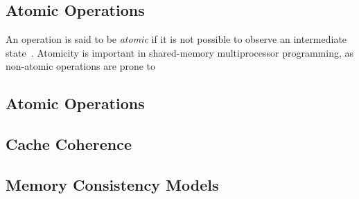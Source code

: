 \subsection{Atomic Operations}
An operation is said to be \emph{atomic} if it is not possible to observe an
intermediate state~\cite{perfbook2021}. Atomicity is
important in shared-memory multiprocessor programming, as non-atomic operations
are prone to 




\subsection{Atomic Operations}

\subsection{Cache Coherence}

\subsection{Memory Consistency Models}

